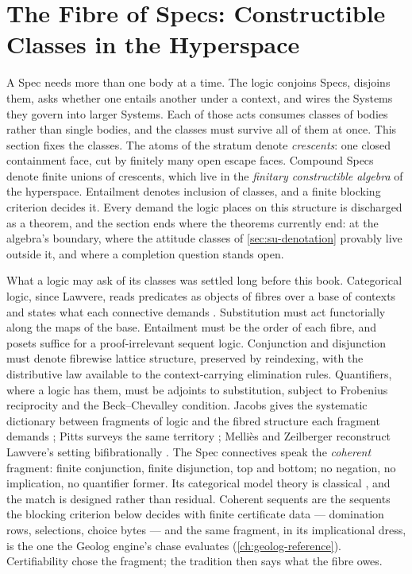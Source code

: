 \section{The Fibre of Specs: Constructible Classes in the
Hyperspace}
\label{sec:su-classes}

A Spec needs more than one body at a time. The logic conjoins
Specs, disjoins them, asks whether one entails another under a
context, and wires the Systems they govern into larger Systems.
Each of those acts consumes classes of bodies rather than single
bodies, and the classes must survive all of them at once. This
section fixes the classes. The atoms of the stratum denote
\emph{crescents}: one closed containment face, cut by finitely many
open escape faces. Compound Specs denote finite unions of
crescents, which live in the \emph{finitary constructible algebra}
of the hyperspace. Entailment denotes inclusion of classes, and a
finite blocking criterion decides it. Every demand the logic places
on this structure is discharged as a theorem, and the section ends
where the theorems currently end: at the algebra's boundary, where
the attitude classes of \autoref{sec:su-denotation} provably live
outside it, and where a completion question stands open.

What a logic may ask of its classes was settled long before this
book. Categorical logic, since Lawvere, reads predicates as objects
of fibres over a base of contexts and states what each connective
demands \cite{lawvere69,lawvere70}. Substitution must act
functorially along the maps of the base. Entailment must be the
order of each fibre, and posets suffice for a proof-irrelevant
sequent logic. Conjunction and disjunction must denote fibrewise
lattice structure, preserved by reindexing, with the distributive
law available to the context-carrying elimination rules.
Quantifiers, where a logic has them, must be adjoints to
substitution, subject to Frobenius reciprocity and the
Beck--Chevalley condition. Jacobs gives the systematic dictionary
between fragments of logic and the fibred structure each fragment
demands \cite{jacobs99}; Pitts surveys the same territory
\cite{pitts00}; Melli\`es and Zeilberger reconstruct Lawvere's
setting bifibrationally \cite{mellies16}. The Spec connectives
speak the \emph{coherent} fragment: finite conjunction, finite
disjunction, top and bottom; no negation, no implication, no
quantifier former. Its categorical model theory is classical
\cite{makkaireyes77}, and the match is designed rather than
residual. Coherent sequents are the sequents the blocking criterion
below decides with finite certificate data --- domination rows,
selections, choice bytes --- and the same fragment, in its
implicational dress, is the one the Geolog engine's chase evaluates
(\autoref{ch:geolog-reference}). Certifiability chose the fragment;
the tradition then says what the fibre owes.

